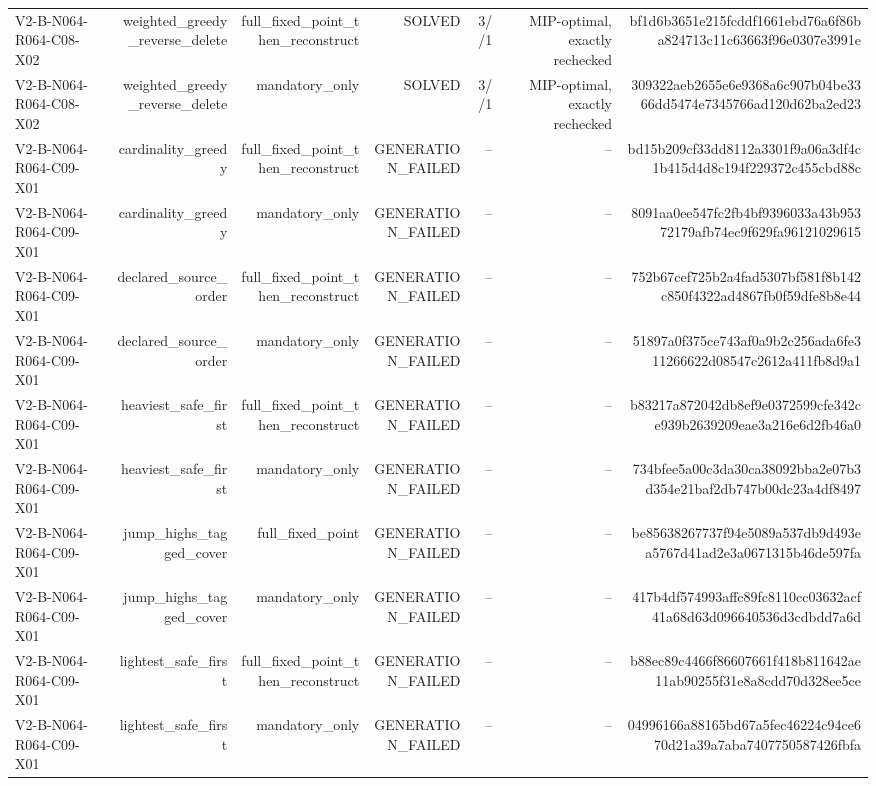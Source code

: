 {\begin{longtable}{lrrrrrr}
V2-B-N064-R064-C08-X02 & weighted\_greedy\_reverse\_delete & full\_fixed\_point\_then\_reconstruct & SOLVED & 3//1 & MIP-optimal, exactly rechecked & bf1d6b3651e215fcddf1661ebd76a6f86ba824713c11c63663f96e0307e3991e \\
V2-B-N064-R064-C08-X02 & weighted\_greedy\_reverse\_delete & mandatory\_only & SOLVED & 3//1 & MIP-optimal, exactly rechecked & 309322aeb2655e6e9368a6c907b04be3366dd5474e7345766ad120d62ba2ed23 \\
V2-B-N064-R064-C09-X01 & cardinality\_greedy & full\_fixed\_point\_then\_reconstruct & GENERATION\_FAILED & -- & -- & bd15b209cf33dd8112a3301f9a06a3df4c1b415d4d8c194f229372c455cbd88c \\
V2-B-N064-R064-C09-X01 & cardinality\_greedy & mandatory\_only & GENERATION\_FAILED & -- & -- & 8091aa0ee547fc2fb4bf9396033a43b95372179afb74ec9f629fa96121029615 \\
V2-B-N064-R064-C09-X01 & declared\_source\_order & full\_fixed\_point\_then\_reconstruct & GENERATION\_FAILED & -- & -- & 752b67cef725b2a4fad5307bf581f8b142c850f4322ad4867fb0f59dfe8b8e44 \\
V2-B-N064-R064-C09-X01 & declared\_source\_order & mandatory\_only & GENERATION\_FAILED & -- & -- & 51897a0f375ce743af0a9b2c256ada6fe311266622d08547c2612a411fb8d9a1 \\
V2-B-N064-R064-C09-X01 & heaviest\_safe\_first & full\_fixed\_point\_then\_reconstruct & GENERATION\_FAILED & -- & -- & b83217a872042db8ef9e0372599cfe342ce939b2639209eae3a216e6d2fb46a0 \\
V2-B-N064-R064-C09-X01 & heaviest\_safe\_first & mandatory\_only & GENERATION\_FAILED & -- & -- & 734bfee5a00c3da30ca38092bba2e07b3d354e21baf2db747b00dc23a4df8497 \\
V2-B-N064-R064-C09-X01 & jump\_highs\_tagged\_cover & full\_fixed\_point & GENERATION\_FAILED & -- & -- & be85638267737f94e5089a537db9d493ea5767d41ad2e3a0671315b46de597fa \\
V2-B-N064-R064-C09-X01 & jump\_highs\_tagged\_cover & mandatory\_only & GENERATION\_FAILED & -- & -- & 417b4df574993affc89fc8110cc03632acf41a68d63d096640536d3cdbdd7a6d \\
V2-B-N064-R064-C09-X01 & lightest\_safe\_first & full\_fixed\_point\_then\_reconstruct & GENERATION\_FAILED & -- & -- & b88ec89c4466f86607661f418b811642ae11ab90255f31e8a8cdd70d328ee5ce \\
V2-B-N064-R064-C09-X01 & lightest\_safe\_first & mandatory\_only & GENERATION\_FAILED & -- & -- & 04996166a88165bd67a5fec46224c94ce670d21a39a7aba7407750587426fbfa \\

\end{longtable}}
